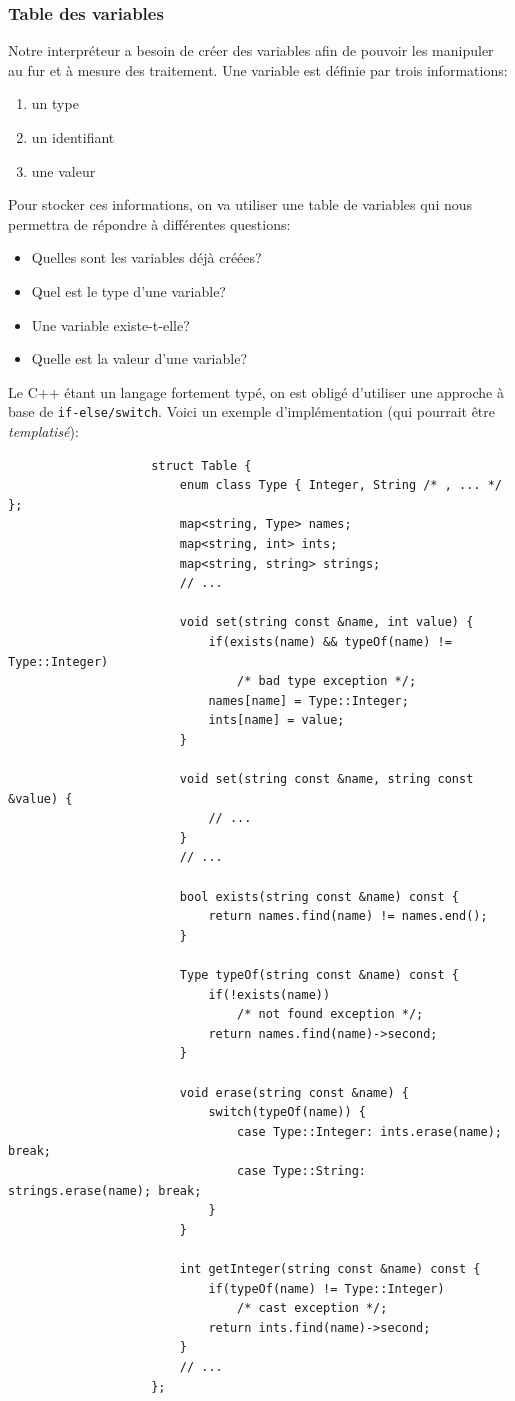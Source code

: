 \documentclass[french]{article}
\begin{document}
			\subsubsection{Table des variables}
				\label{subsubsec:table-des-variables}
				Notre interpréteur a besoin de créer des variables afin de pouvoir les manipuler au fur et à mesure des traitement. Une variable est définie par trois informations:
				
				\begin{enumerate}
					\item un type
					\item un identifiant
					\item une valeur
				\end{enumerate}
				
				Pour stocker ces informations, on va utiliser une table de variables qui nous permettra de répondre à différentes questions:
				
				\begin{itemize}
					\item Quelles sont les variables déjà créées?
					\item Quel est le type d'une variable?
					\item Une variable existe-t-elle?
					\item Quelle est la valeur d'une variable?
				\end{itemize}
				
				Le C++ étant un langage fortement typé, on est obligé d'utiliser une approche à base de \texttt{if-else/switch}. Voici un exemple d'implémentation (qui pourrait être \textit{templatisé}):
				
				\begin{lstlisting}
					struct Table {
						enum class Type { Integer, String /* , ... */ };
						map<string, Type> names;
						map<string, int> ints;
						map<string, string> strings;
						// ...
						
						void set(string const &name, int value) {
							if(exists(name) && typeOf(name) != Type::Integer)
								/* bad type exception */;
							names[name] = Type::Integer;
							ints[name] = value;
						}
						
						void set(string const &name, string const &value) {
							// ...
						}
						// ...
						
						bool exists(string const &name) const {
							return names.find(name) != names.end();
						}
						
						Type typeOf(string const &name) const {
							if(!exists(name))
								/* not found exception */;
							return names.find(name)->second;
						}
						
						void erase(string const &name) {
							switch(typeOf(name)) {
								case Type::Integer: ints.erase(name); break;
								case Type::String: strings.erase(name); break;
							}
						}
						
						int getInteger(string const &name) const {
							if(typeOf(name) != Type::Integer)
								/* cast exception */;
							return ints.find(name)->second;
						}
						// ...
					};
				\end{lstlisting}
				
\end{document}
